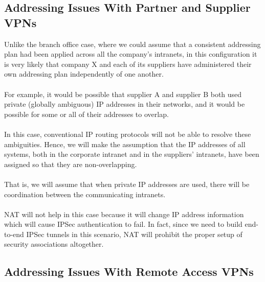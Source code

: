 \documentclass[10pt,a4paper]{article}
\begin{document}
\begin{itemize}
\begin{itemize}
\begin{itemize}
\subsection{Addressing Issues With Partner and Supplier VPNs}
Unlike the branch office case, where we could assume that a consistent
addressing plan had been applied across all the company's intranets, in this
configuration it is very likely that company X and each of its suppliers have
administered their own addressing plan independently of one another. 
\\
\\
For
example, it would be possible that supplier A and supplier B both used private
(globally ambiguous) IP addresses in their networks, and it would be possible for
some or all of their addresses to overlap. 
\\
\\
In this case, conventional IP routing
protocols will not be able to resolve these ambiguities. Hence, we will make the
assumption that the IP addresses of all systems, both in the corporate intranet
and in the suppliers' intranets, have been assigned so that they are
non-overlapping. 
\\
\\
That is, we will assume that when private IP addresses are
used, there will be coordination between the communicating intranets.
\\
\\
NAT will not help in this case because it will change IP address information which
will cause IPSec authentication to fail. In fact, since we need to build end-to-end
IPSec tunnels in this scenario, NAT will prohibit the proper setup of security
associations altogether.


\subsection{Addressing Issues With Remote Access VPNs}


\end{itemize}
\end{itemize}
\end{itemize}
\end{document}
